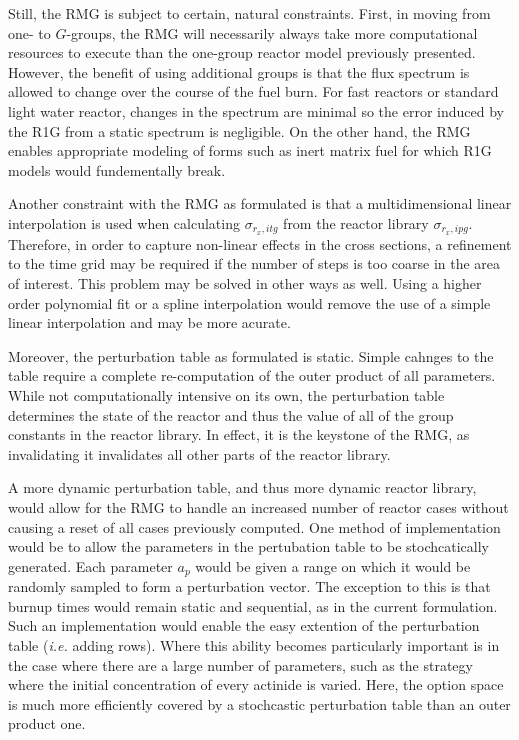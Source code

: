 Still, the RMG is subject to certain, natural constraints.  First, in moving from one- to $G$-groups,
the RMG will necessarily always take more computational resources to execute than the one-group
reactor model previously presented.  However, the benefit of using additional groups is that the flux
spectrum is allowed to change over the course of the fuel burn.  For fast reactors or standard light 
water reactor, changes in the spectrum are minimal so the error induced by the R1G from a static spectrum
is negligible.  On the other hand, the RMG enables appropriate modeling of forms such as inert matrix 
fuel for which R1G models would fundementally break.

Another constraint with the RMG as formulated is that a multidimensional linear interpolation is 
used when calculating $\sigma_{r_x,itg}$ from the reactor library $\sigma_{r_x,ipg}$.  Therefore, 
in order to capture non-linear effects in the cross sections, a refinement to the time grid may 
be required if the number of steps is too coarse in the area of interest.  This problem may be solved
in other ways as well.  Using a higher order polynomial fit or a spline interpolation would 
remove the use of a simple linear interpolation and may be more acurate.

Moreover, the perturbation table as formulated is static.  Simple cahnges to the table
require a complete re-computation of the outer product of all parameters.  While not computationally
intensive on its own, the perturbation table determines the state of the reactor and thus the 
value of all of the group constants in the reactor library.  In effect, it is the keystone of the RMG, 
as invalidating it invalidates all other parts of the reactor library.  

A more dynamic perturbation table, and thus more dynamic reactor library, would allow for the RMG to 
handle an increased number of reactor cases without causing a reset of all cases previously computed.
One method of implementation would be to allow the parameters in the pertubation table to be stochcatically
generated.  Each parameter $a_p$ would be given a range on which it would be randomly sampled to form a 
perturbation vector.  The exception to this is that burnup times would remain static and sequential, as
in the current formulation.  Such an implementation would enable the easy extention of the perturbation 
table (\emph{i.e.} adding rows).  Where this ability becomes particularly important is in the case 
where there are a large number of parameters, such as the strategy where the initial concentration of 
every actinide is varied.  Here, the option space is much more efficiently covered by a stochcastic 
perturbation table than an outer product one.

